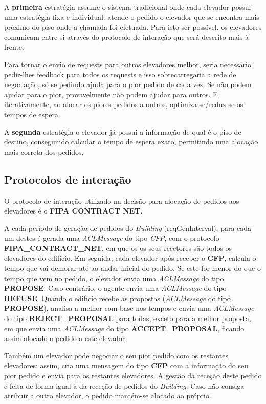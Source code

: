 \documentclass[a4paper]{article}
\begin{document}
A \textbf{primeira} estratégia assume o sistema tradicional onde cada elevador possui uma estratégia fixa e individual: atende o pedido o elevador que se encontra mais próximo do piso onde a chamada foi efetuada. Para isto ser possível, os elevadores comunicam entre si através do protocolo de interação que será descrito mais à frente. 

Para tornar o envio de requests para outros elevadores melhor, seria necessário pedir-lhes feedback para todos os requests e isso sobrecarregaria a rede de negociação, só se pedindo ajuda para o pior pedido de cada vez. Se não podem ajudar para o pior, provavelmente não podem ajudar para outros. E iterativamente, ao alocar os piores pedidos a outros, optimiza-se/reduz-se os tempos de espera.

A \textbf{segunda} estratégia o elevador já possui a informação de qual é o piso de destino, conseguindo calcular o tempo de espera exato, permitindo uma alocação mais correta dos pedidos.

\subsection{Protocolos de interação} 

O protocolo de interação utilizado na decisão para alocação de pedidos aos elevadores é o \textbf{FIPA CONTRACT NET}.

A cada período de geração de pedidos do \textit{Building} (reqGenInterval), para cada um destes é gerada uma \textit{ACLMessage} do tipo \textit{CFP}, com o protocolo \textbf{FIPA\_CONTRACT\_NET}, em que os os seus recetores são todos os elevadores do edifício. Em seguida, cada elevador após receber o \textbf{CFP}, calcula o tempo que vai demorar até ao andar inicial do pedido. Se este for menor do que o tempo que vem no pedido, o elevador envia uma \textit{ACLMessage} do tipo \textbf{PROPOSE}. Caso contrário, o agente envia uma \textit{ACLMessage} do tipo \textbf{REFUSE}. Quando o edifício recebe as propostas (\textit{ACLMessage} do tipo \textbf{PROPOSE}), analisa a melhor com base nos tempos e envia uma \textit{ACLMessage} do tipo \textbf{REJECT\_PROPOSAL} para todas, exceto para a melhor proposta, em que envia uma \textit{ACLMessage} do tipo \textbf{ACCEPT\_PROPOSAL}, ficando assim alocado o pedido a este elevador.

Também um elevador pode negociar o seu pior pedido com os restantes elevadores: assim, cria uma mensagem do tipo \textbf{CFP} com a informação do seu pior pedido e envia para os restantes elevadores. A gestão da receção deste pedido é feita de forma igual à da receção de pedidos do \textit{Building}. Caso não consiga atribuir a outro elevador, o pedido mantém-se alocado ao próprio. 
\end{document}
